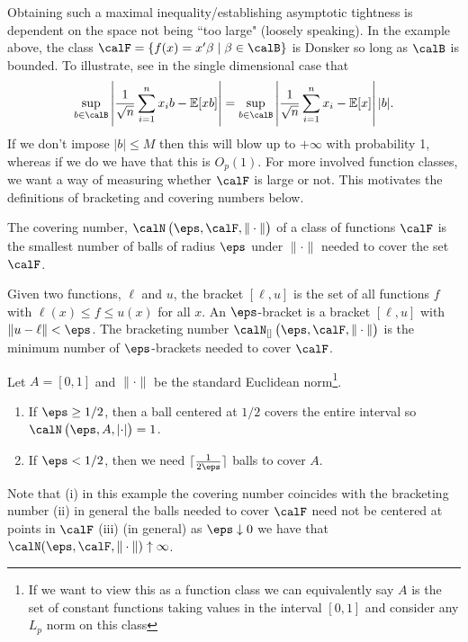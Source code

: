 Obtaining such a maximal inequality/establishing asymptotic tightness is dependent on the space not being ``too large" (loosely speaking). In the example above, the class \(\calF = \{f(x) = x'\beta\mid \beta\in\calB\} \) is Donsker so long as \(\calB\) is bounded. To illustrate, see in the single dimensional case that
\[
	\sup_{b\in \calB}\left|\frac{1}{\sqrt{n}}\sum_{i=1}^n x_ib - \E[xb] \right| = \sup_{b\in\calB} \left|\frac{1}{\sqrt{n}}\sum_{i=1}^n x_i - \E[x] \right||b|
.\]
If we don't impose \(|b|\leq M\) then this will blow up to \(+\infty\) with probability 1, whereas if we do we have that this is  \(O_p(1)\). For more involved function classes, we want a way of measuring whether  \(\calF\) is large or not. This motivates the definitions of bracketing and covering numbers below.

\begin{definition}
	\label{def:covering}
	The covering number, \(\calN\left(\eps,\calF,\|\cdot\|\right)\) of a class of functions \(\calF\) is the smallest number of balls of radius  \(\eps\) under  \(\|\cdot\|\) needed to cover the set \(\calF\).
\end{definition}

\begin{definition}
	\label{def:bracketing}
	Given two functions, \(\ell\) and \(u\), the bracket \([\ell,u]\) is the set of all functions  \(f\) with  \(\ell(x)\leq f\leq u(x)\) for all \(x\). An  \(\eps\)-bracket is a bracket  \([\ell,u]\) with  \(\|u-\ell\|< \eps\). The bracketing number \(\calN_{[]}\left(\eps,\calF,\|\cdot\|\right)\) is the minimum number of \(\eps\)-brackets needed to cover  \(\calF\).
\end{definition}

\begin{example}
	\label{ex:covering}
	Let \(A = [0,1]\) and  \(\|\cdot\|\) be the standard Euclidean norm\footnote{If we want to view this as a function class we can equivalently say \(A\) is the set of constant functions taking values in the interval  \([0,1]\) and consider any \(L_p\) norm on this class}.
	\begin{enumerate}
		\item If \(\eps \geq 1/2\), then a ball centered at  \(1/2\) covers the entire interval so  \(\calN\left(\eps,A,\left|\cdot\right|\right) = 1\).
		\item If \(\eps < 1/2\), then we need \(\lceil \frac{1}{2\eps}\rceil\) balls to cover \(A\).
	\end{enumerate}
	Note that (i) in this example the covering number coincides with the bracketing number (ii) in general the balls needed to cover \(\calF\) need not be centered at points in \(\calF\) (iii) (in general) as \(\eps\downarrow 0\) we have that  \(\calN(\eps,\calF,\|\cdot\|)\uparrow\infty\). 
\end{example}

